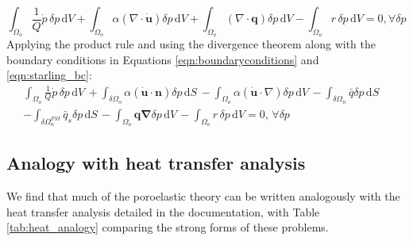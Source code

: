\documentclass[oneside,11pt,times]{book}
\begin{document}
\begin{equation} 
\int_{\Omega_{o}}  \frac{1}{Q}\dot{p}\, \delta p\, \text{d} V+ \int_{\Omega_{o}}  \alpha\left(\nabla\cdot\bm{\dot{u}}\right)\delta p\, \text{d} V +\int_{\Omega_{o}} \left(\nabla\cdot\bm{q}\right)\delta p\, \text{d} V-\int_{\Omega_{o}} r\,\delta p\, \text{d} V=0 , \forall \delta p
\end{equation}
\noindent Applying the product rule and using the divergence theorem along with the boundary conditions in Equations \eqref{eqn:boundaryconditions} and \eqref{eqn:starling_bc}:
\begin{equation} \label{eqn:weakflux}
\begin{split}
\int_{\Omega_{o}} \frac{1}{Q}\dot{p}\, \delta p\, \text{d} V\,+ \int_{\delta\Omega_{o}} \alpha\left(  \bm{\dot{u}}  \cdot \bm{n} \right)  \delta p \, \text{d} S\,  - \int_{\Omega_{o}} \alpha\left(  \bm{\dot{u}}  \cdot \nabla \right)  \delta p \, \text{d} V\, -\int_{\delta \Omega_{n}} \bar{q} \delta p \, \text{d} S\,& \\ -\int_{\delta \Omega_{n}^{FSI}} \bar{q}_s \delta p \, \text{d} S\, -\int_{\Omega_{o}}\bm{q}\bm{\nabla}\delta p\,\text{d} V\, -\int_{\Omega_{o}}r\,\delta p\, \text{d} V=0 , \, \forall \delta p&
\end{split}
\end{equation}

\subsection{Analogy with heat transfer analysis}
We find that much of the poroelastic theory can be written analogously with the heat transfer analysis detailed in the documentation, with Table \ref{tab:heat_analogy} comparing the strong forms of these problems. 
\end{document}
